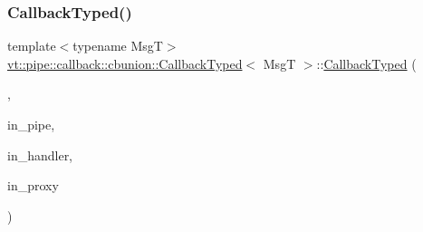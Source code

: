 \subsubsection{\texorpdfstring{Callback\+Typed()}{CallbackTyped()}\hspace{0.1cm}{\footnotesize\ttfamily [11/14]}}
{\footnotesize\ttfamily template$<$typename MsgT$>$ \\
\hyperlink{structvt_1_1pipe_1_1callback_1_1cbunion_1_1_callback_typed}{vt\+::pipe\+::callback\+::cbunion\+::\+Callback\+Typed}$<$ MsgT $>$\+::\hyperlink{structvt_1_1pipe_1_1callback_1_1cbunion_1_1_callback_typed}{Callback\+Typed} (\begin{DoxyParamCaption}\item[{Raw\+Bcast\+Obj\+Grp\+Tag\+Type}]{,  }\item[{\hyperlink{namespacevt_ac9852acda74d1896f48f406cd72c7bd3}{Pipe\+Type}}]{in\+\_\+pipe,  }\item[{\hyperlink{namespacevt_af64846b57dfcaf104da3ef6967917573}{Handler\+Type}}]{in\+\_\+handler,  }\item[{\hyperlink{namespacevt_ad7cae989df485fccca57f0792a880a8e}{Obj\+Group\+Proxy\+Type}}]{in\+\_\+proxy }\end{DoxyParamCaption})\hspace{0.3cm}{\ttfamily [inline]}}

\mbox{\label{structvt_1_1pipe_1_1callback_1_1cbunion_1_1_callback_typed_ac60ced3929a744b3953b7b96b4185c5b}} 
